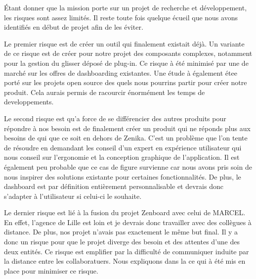 Étant donner que la mission porte sur un projet de recherche et développement, les risques sont assez limités. Il reste toute fois quelque écueil que nous avons identifiés en début de projet afin de les éviter.

Le premier risque est de créer un outil qui finalement existait déjà. Un variante de ce risque est de créer pour notre projet des composants complexes, notamment pour la gestion du glisser déposé de plug-in. Ce risque à été minimisé par une de marché sur les offres de dashboarding existantes. Une étude à également étee porté sur les projets open source des quels nous pourrins partir pour créer notre produit. Cela aurais permis de racourcir énormément les temps de developpements. 

Le second risque est qu'a force de se différencier des autres produits pour répondre à nos besoin est de finalement créer un produit qui ne réponds plus aux besoins de qui que ce soit en dehors de Zenika. C'est un problème que l'on tente de résoudre en demandant les conseil d'un expert en expérience utilisateur qui nous conseil sur l'ergonomie et la conception graphique de l'application. Il est également peu probable que ce cas de figure survienne car nous avons pris soin de nous inspirer des solutions existante pour certaines fonctionnalités. De plus, le dashboard est par définition entièrement personnalisable et devrais donc s'adapter à l'utilisateur si celui-ci le souhaite.

Le dernier risque est lié à la fusion du projet Zenboard avec celui de MARCEL. En effet, l'agence de Lille est loin et je devrais donc travailler avec des collègues à distance. De plus, nos projet n'avais pas exactement le même but final. Il y a donc un risque pour que le projet diverge des besoin et des attentes d'une des deux entités. Ce risque est emplifier par la difficulté de communiquer induite par la distance entre les collaboratuers. Nous expliquons dans la  ce qui à été mis en place pour minimiser ce risque.